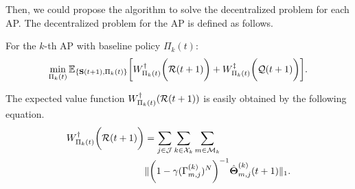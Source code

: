 Then, we could propose the algorithm to solve the decentralized problem for each AP.
The decentralized problem for the AP is defined as follows.
\begin{problem}
    For the $k$-th AP with baseline policy $\Pi_{k}(t)$:
    {\small
    \begin{align}
        \min_{\Pi_{k}(t)} \mathbb{E}_{\{ \mathbf{S}(t+1), \Pi_{k}(t) \}} \bigg[
            W^{\dagger}_{\Pi_{k}(t)}\bigg(\mathcal{R}(t+1)\bigg) + W^{\ddagger}_{\Pi_{k}(t)}\bigg(\mathcal{Q}(t+1)\bigg)
        \bigg].
        \label{eqn:partial}
    \end{align}
    }
\end{problem}

The expected value function $W^{\dagger}_{\Pi_{k}(t)}(\mathcal{R}(t+1))$ is easily obtained by the following equation.
\begin{align}
    W^{\dagger}_{\Pi_{k}(t)}\bigg(\mathcal{R}(t+1)\bigg) &= \sum_{j\in\mathcal{J}}\sum_{k\in\mathcal{X}_{k}}\sum_{m\in\mathcal{M}_{k}}
    \nonumber\\
    &\lVert
        \bigg( 1 - \gamma ({\Gamma}^{(k)}_{m,j})^{N} \bigg)^{-1} \hat{\boldsymbol{\Theta}}^{(k)}_{m,j}(t+1)
    \|_1.
    \label{w_ap}
\end{align}

